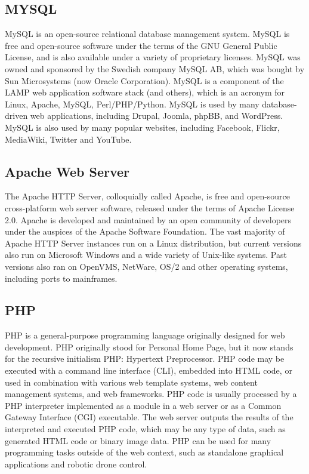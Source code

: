 \documentclass[12pt]{article}
\begin{document}
\subsection{MYSQL}
MySQL is an open-source relational database management system. MySQL is free and open-source software under the terms of the GNU General Public License, and is also available under a variety of proprietary licenses. MySQL was owned and sponsored by the Swedish company MySQL AB, which was bought by Sun Microsystems (now Oracle Corporation). MySQL is a component of the LAMP web application software stack (and others), which is an acronym for Linux, Apache, MySQL, Perl/PHP/Python. MySQL is used by many database-driven web applications, including Drupal, Joomla, phpBB, and WordPress. MySQL is also used by many popular websites, including Facebook, Flickr, MediaWiki, Twitter and YouTube.\cite{mysql}

\subsection{Apache Web Server}
The Apache HTTP Server, colloquially called Apache, is free and open-source cross-platform web server software, released under the terms of Apache License 2.0. Apache is developed and maintained by an open community of developers under the auspices of the Apache Software Foundation. The vast majority of Apache HTTP Server instances run on a Linux distribution, but current versions also run on Microsoft Windows and a wide variety of Unix-like systems. Past versions also ran on OpenVMS, NetWare, OS/2 and other operating systems, including ports to mainframes.\cite{apache}

\subsection{PHP}
PHP is a general-purpose programming language originally designed for web development. PHP originally stood for Personal Home Page,
but it now stands for the recursive initialism PHP: Hypertext Preprocessor. PHP code may be executed with a command line interface (CLI), embedded into HTML code, or used in combination with various web template systems, web content management systems, and web frameworks. PHP code is usually processed by a PHP interpreter implemented as a module in a web server or as a Common Gateway Interface (CGI) executable. The web server outputs the results of the interpreted and executed PHP code, which may be any type of data, such as generated HTML code or binary image data. PHP can be used for many programming tasks outside of the web context, such as standalone graphical applications and robotic drone control.\cite{php}
\end{document}
